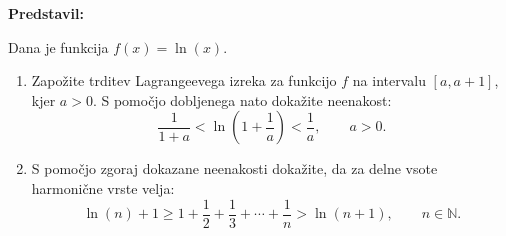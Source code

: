 \textbf{Predstavil:}

Dana je funkcija $f(x) = \ln(x)$.
\begin{enumerate}
\item Zapožite trditev Lagrangeevega izreka za funkcijo $f$ na intervalu $[a, a+1]$, kjer $a > 0$. S pomočjo dobljenega nato dokažite neenakost:
	\[
		\frac{1}{1+a} < \ln \left( 1 + \frac{1}{a} \right) < \frac{1}{a}, \qquad a>0.
	\]
	\item S pomočjo zgoraj dokazane neenakosti dokažite, da za delne vsote harmonične vrste velja:
	\[
		\ln(n) + 1 \geq 1 + \frac{1}{2}+ \frac{1}{3} + \cdots + \frac{1}{n} > \ln(n+1), \qquad n \in \mathbb{N}.
	\]
\end{enumerate}